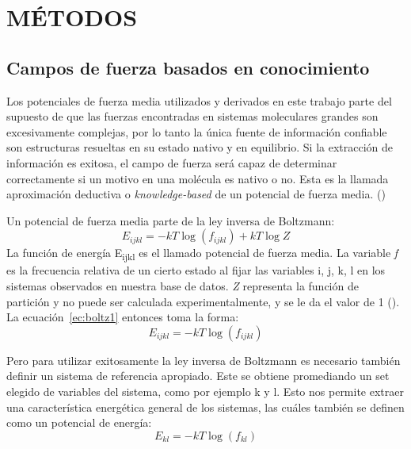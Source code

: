 \newpage
\section*{MÉTODOS}
\par{}
\subsection{Campos de fuerza basados en conocimiento}
\par
Los potenciales de fuerza media utilizados y derivados en este trabajo parte del supuesto de que las fuerzas encontradas en sistemas moleculares grandes son excesivamente complejas, por lo tanto la única fuente de información confiable son estructuras resueltas en su estado nativo y en equilibrio. 
Si la extracción de información es exitosa, el campo de fuerza será capaz de determinar correctamente si un motivo en una molécula es nativo o no. 
Esta es la llamada aproximación deductiva o \textit{knowledge-based} de un potencial de fuerza 
media. (\cite{Sippl1993})
\par
Un potencial de fuerza media parte de la ley inversa de Boltzmann:
\begin{equation}
E_{ijkl} = -kT\log(f_{ijkl}) + kT\log Z \label{ec:boltz1}
\end{equation}
La función de energía E\textsubscript{ijkl} es el llamado potencial de fuerza media. 
La variable \textit{f} es la frecuencia relativa de un cierto estado al fijar las variables i, j, k, l en 
los sistemas observados en nuestra base de datos. 
\textit{Z} representa la función de partición y no puede ser calculada experimentalmente, y se le da el 
valor de 1 (\cite{Sippl1993}). 
La ecuación~\eqref{ec:boltz1}  entonces toma la forma:
\begin{equation}
E_{ijkl} = -kT\log(f_{ijkl}) \label{ec:boltz2}
\end{equation}
\par
Pero para utilizar exitosamente la ley inversa de Boltzmann es necesario también definir un sistema de referencia apropiado. 
Este se obtiene promediando un set elegido de variables del sistema, como por ejemplo k y l.
Esto nos permite extraer una característica energética general de los sistemas, las cuáles también se definen como un potencial de energía:
\begin{equation}
E_{kl} = -kT\log(f_{kl}) \label{ec:boltzref}
\end{equation}
\par
